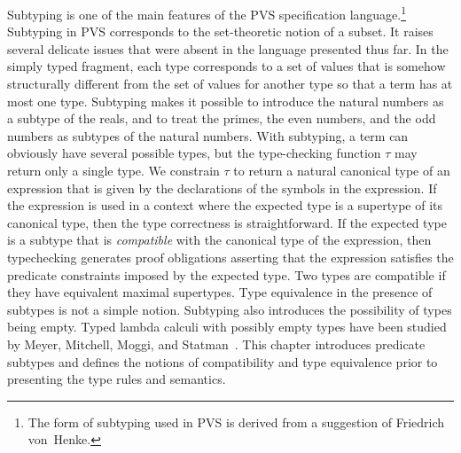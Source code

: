 \documentclass [12pt,twoside]{cslreport}
\begin{document}
Subtyping is one of the main features of the PVS specification
language.\footnote{The form of subtyping used in PVS is derived from a
suggestion of Friedrich von~Henke.}  Subtyping in PVS corresponds to the
set-theoretic notion of a subset.  It raises several delicate issues that
were absent in the language presented thus far.  In the simply typed
fragment, each type corresponds to a set of values that is somehow
structurally different from the set of values for another type so that a
term has at most one type.  Subtyping makes it possible to introduce the
natural numbers as a subtype of the reals, and to treat the primes, the
even numbers, and the odd numbers as subtypes of the natural numbers.
With subtyping, a term can obviously have several possible types, but the
type-checking function $\tau$ may return only a single type.  We constrain
$\tau$ to return a natural canonical type of an expression that is given
by the declarations of the symbols in the expression.  If the expression
is used in a context where the expected type is a supertype of its
canonical type, then the type correctness is straightforward.  If the
expected type is a subtype that is {\em compatible\/} with the canonical
type of the expression, then typechecking generates proof obligations
asserting that the expression satisfies the predicate constraints imposed
by the expected type.  Two types are compatible if they have equivalent
maximal supertypes.  Type equivalence in the presence of subtypes is not a
simple notion.  Subtyping also introduces the possibility of types being
empty.  Typed lambda calculi with possibly empty types have been studied
by Meyer, Mitchell, Moggi, and Statman~\cite{MMMS:empty}.  This chapter
introduces predicate subtypes and defines the notions of compatibility and
type equivalence prior to presenting the type rules and semantics.
\end{document}
